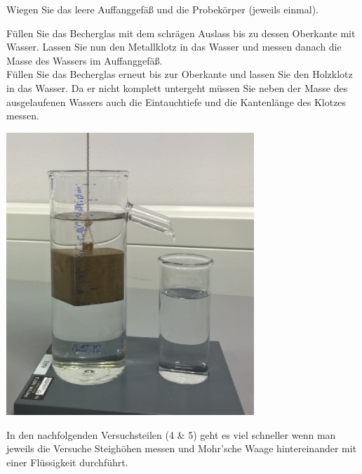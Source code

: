 %
\begin{enumerate} \setcounter{enumi}{1}

 \begin{minipage}{0.5\textwidth}
	\item Wiegen Sie das leere Auffanggefäß und die Probekörper (jeweils einmal). 
	\item Füllen Sie das Becherglas mit dem schrägen Auslass bis zu dessen Oberkante mit Wasser. Lassen Sie nun den Metallklotz in das Wasser und messen danach die Masse des Wassers im Auffanggefäß. \\
	Füllen Sie das Becherglas erneut bis zur Oberkante und lassen Sie den Holzklotz in das Wasser. Da er nicht komplett untergeht müssen Sie neben der Masse des ausgelaufenen Wassers auch die Eintauchtiefe und die Kantenlänge des Klotzes messen.
 \end{minipage}
 \begin{minipage}{0.5\textwidth}
	\centering
	\includegraphics[width=0.7\textwidth]{Abbildungen/V7-2.jpg}
 \end{minipage}
\end{enumerate}
%
\begin{hint}
	In den nachfolgenden Versuchsteilen (4 \& 5) geht es viel schneller wenn man jeweils die Versuche Steighöhen messen und Mohr'sche Waage hintereinander mit einer Flüssigkeit durchführt.
\end{hint}

